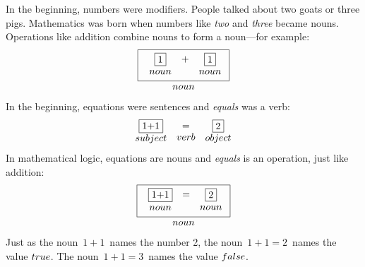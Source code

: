 \documentclass[fleqn,leqno]{article}
\begin{document}
In the beginning, numbers were modifiers.  People talked about two
goats or three pigs.  Mathematics was born when numbers like
\emph{two} and \emph{three} became nouns.
%
Operations like addition combine nouns to form a noun---for example:
 \[
\begin{array}{c}
 \fbox{
$
\begin{array}{c}
 \fbox{1}  \\ \mbox{\footnotesize noun}
 \end{array} 
\begin{array}{c}
+ \\ \mbox{\footnotesize\strut}
\end{array}
 \begin{array}{c}
 \fbox{1} \\ \mbox{\footnotesize noun}
 \end{array}
$}
\\
\mbox{\footnotesize noun}
\end{array}
 \] 
In the beginning, equations were sentences and \emph{equals} was a
verb:
 \[ \begin{array}{c}
   \fbox{1+1} \\ \mbox{\footnotesize subject}
   \end{array}
   \begin{array}{c}
   = \\ \mbox{\footnotesize \strut verb}
   \end{array}
   \begin{array}{c}
   \fbox{2} \\ \mbox{\footnotesize object}
   \end{array}
 \] 
In mathematical logic, equations are nouns and \emph{equals}
is an operation, just like addition:
 \[
\begin{array}{c}
 \fbox{
$
\begin{array}{c}
 \fbox{1+1}  \\ \mbox{\footnotesize noun}
 \end{array} 
\begin{array}{c}
= \\ \mbox{\footnotesize\strut}
\end{array}
 \begin{array}{c}
 \fbox{2} \\ \mbox{\footnotesize noun}
 \end{array}
$}
\\
\mbox{\footnotesize noun}
\end{array}
 \] 
Just as the noun \,$1+1$\, names the number 2, the noun \,$1+1=2$\, names the
value 
$\TRUE$.  The noun \,$1+1=3$\, names the value 
$\FALSE$.
\end{document}
